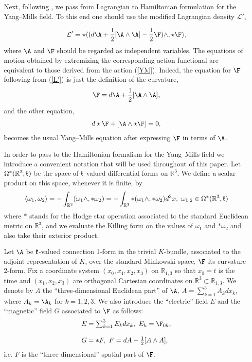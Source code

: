 \documentclass{amsart}
\begin{document}
Next, following \cite{FS}, we pass from Lagrangian to Hamiltonian
formulation for the Yang--Mills field. To this end one should use the modified
Lagrangian density $\mathcal{L}'$,

\begin{equation}\label{L'}
\mathcal{L}'= \star((d\A + \frac{1}{2} [\A\wedge \A]- \frac 12 \F )\wedge , \star\F),
\end{equation}
where $\A$ and $\F$ should be regarded as independent variables. The
equations of motion obtained by extremizing the corresponding action functional are equivalent
to those derived from the action (\ref{YM}). Indeed, the equation for $\F$
following from (\ref{L'}) is just the definition of the curvature,
\begin{equation}\label{nondyn}
\F=d\A + \frac{1}{2} [\A\wedge \A],
\end{equation}
and the other equation,
$$
d\star \F+[\A \wedge \star \F]=0,
$$
becomes the usual Yang--Mills equation after expressing $\F$
in terms of $\A$.

In order to pass to the Hamiltonian formalism for the Yang--Mills field we
introduce a convenient notation that will be used throughout of this paper.
Let $\Omega^*(\mathbb{R}^{3},\mathfrak k)$ be the space of
$\mathfrak k$-valued differential forms on $\mathbb{R}^{3}$. We
define a scalar product on this space, whenever it is finite, by
\begin{equation}\label{prod}
\langle \omega_1,\omega_2\rangle =-\int_{\mathbb{R}^{3}}(\omega_1\wedge,*\omega_2)=
-\int_{\mathbb{R}^{3}}*(\omega_1\wedge,*\omega_2)d^{3}x,~
\omega_{1,2} \in \Omega^*(\mathbb{R}^{3},\mathfrak k)
\end{equation}
where $*$ stands for the Hodge star operation associated to the standard
Euclidean metric on  $\mathbb{R}^{3}$, and we evaluate the Killing form on the
values of $\omega_1$ and $*\omega_2$ and also take their exterior product.

Let $\A$ be $\mathfrak k$-valued connection 1-form in the trivial $K$-bundle, associated to
the adjoint representation of $K$, over the standard Minkowski space, $\F$ its curvature
2-form. Fix a coordinate system $(x_0,x_1,x_2,x_3)$ on ${\mathbb R}_{1,3}$ so that $x_0=t$ is the time and $(x_1,x_2,x_3)$ are orthogonal Cartesian coordinates on $\mathbb{R}^{3}\subset {\mathbb R}_{1,3}$. We denote by $A$ the ``three-dimensional Euclidean part'' of $\A$,
$A=\sum_{k=1}^{3}A_kdx_k$, where $A_k=\A_k$ for
$k=1,2,3$. We also introduce the ``electric'' field $E$ and the ``magnetic''
field $G$ associated to $\F$ as follows:
$$
\begin{array}{l}
E=\sum_{k=1}^{3}E_kdx_k,~ E_k=\F_{0k}, \\
\\
G=*F,~ F=dA + \frac{1}{2} [A\wedge A],
\end{array}
$$
i.e. $F$ is the ``three-dimensional'' spatial part of $\F$.
\end{document}
